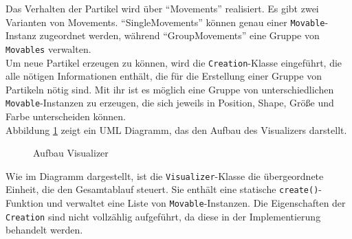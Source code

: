 \documentclass[11pt,a4paper]{article}
\begin{document}
Das Verhalten der Partikel wird über ``Movements'' realisiert. Es gibt zwei Varianten von Movements. ``SingleMovements'' können genau einer \lstinline!Movable!-Instanz zugeordnet werden, während ``GroupMovements'' eine Gruppe von \lstinline!Movables! verwalten.\\
Um neue Partikel erzeugen zu können, wird die \lstinline!Creation!-Klasse eingeführt, die alle nötigen Informationen enthält, die für die Erstellung einer Gruppe von Partikeln nötig sind. Mit ihr ist es möglich eine Gruppe von unterschiedlichen \lstinline!Movable!-Instanzen zu erzeugen, die sich jeweils in Position, Shape, Größe und Farbe unterscheiden können.\\
Abbildung \ref{fig:AufbauVisualizer} zeigt ein UML Diagramm, das den Aufbau des Visualizers darstellt.\\

\begin{figure}[!ht]
\centering
{}
\caption[Aufbau Visualizer]{Aufbau Visualizer}
\label{fig:AufbauVisualizer}
\end{figure}
\noindent
Wie im Diagramm dargestellt, ist die \lstinline!Visualizer!-Klasse die übergeordnete Einheit, die den Gesamtablauf steuert. Sie enthält eine statische \lstinline!create()!-Funktion und verwaltet eine Liste von \lstinline!Movable!-Instanzen. Die Eigenschaften der \lstinline!Creation! sind nicht vollzählig aufgeführt, da diese in der Implementierung behandelt werden.
\end{document}
